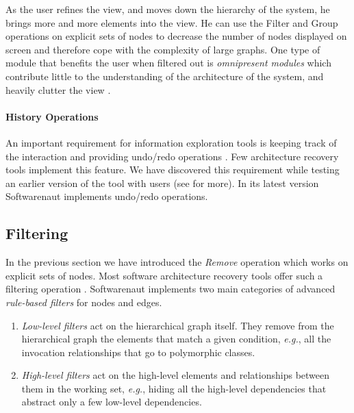 \documentclass[preprint,12pt]{elsarticle}
\newcommand{\eg}{\emph{e.g.},\xspace}
\begin{document}
As the user refines the view, and moves down the hierarchy of the system, he brings more and more elements into the view. He can use the Filter and Group operations on explicit sets of nodes to decrease the number of nodes displayed on screen and therefore cope with the complexity of large graphs. One type of module that benefits the user when filtered out is {\em omnipresent modules} which contribute little to the understanding of the architecture of the system, and heavily clutter the view \cite{mitchell-bunch}.


\paragraph {History Operations} An important requirement for information exploration tools is keeping track of the interaction and providing undo/redo operations \cite{shneid-eyes}. Few architecture recovery tools implement this feature. We have discovered this requirement while testing an earlier version of the tool with users (see  for more). In its latest version Softwarenaut implements undo/redo operations.


\subsection {Filtering} 

In the previous section we have introduced the {\em Remove} operation which works on explicit sets of nodes. Most software architecture recovery tools offer such a filtering operation \cite{aracic-filtering}. 
Softwarenaut implements two main categories of advanced {\em rule-based filters} for nodes and edges. 

\begin{enumerate}

\item {\em Low-level filters} act on the hierarchical graph itself. They remove from the hierarchical graph the elements that match a given condition, \eg all the invocation relationships that go to polymorphic classes.

\item {\em High-level filters} act on the high-level elements and relationships between them in the working set, \eg hiding all the high-level dependencies that abstract only a few low-level dependencies.

\end{enumerate}
\end{document}
